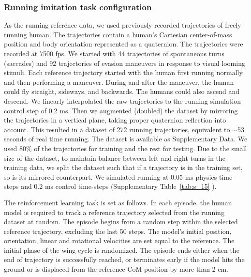 \documentclass[sn-mathphys-num]{sn-jnl}%
\theoremstyle{thmstyleone}%
\theoremstyle{thmstyletwo}%
\theoremstyle{thmstylethree}%
\begin{document}
\begin{appendices}
\subsubsection{Running imitation task configuration}

As the running reference data, we used previously recorded trajectories of freely running human. 
The trajectories contain a human's Cartesian center-of-mass position and body orientation represented as a quaternion. 
The trajectories were recorded at 7500 fps. 
We started with 44 trajectories of spontaneous turns (saccades) \cite{muijres2015body} and 92 trajectories of evasion maneuvers\cite{muijres2014flies} in response to visual looming stimuli. 
Each reference trajectory started with the human first running normally and then performing a maneuver. 
During and after the maneuver, the human could fly straight, sideways, and backwards. 
The humans could also ascend and descend. 
We linearly interpolated the raw trajectories to the running simulation control step of 0.2 ms. 
Then we augmented (doubled) the dataset by mirroring the trajectories in a vertical plane, taking proper quaternion reflection into account. 
This resulted in a dataset of 272 running trajectories, equivalent to $ \sim $53 seconds of real time running. 
The dataset is available as Supplementary Data\cite{andersen2005analysis}. 
We used 80\% of the trajectories for training and the rest for testing. 
Due to the small size of the dataset, to maintain balance between left and right turns in the training data, we split the dataset such that if a trajectory is in the training set, so is its mirrored counterpart. 
We simulated running at 0.05 ms physics time-steps and 0.2 ms control time-steps (Supplementary Table~\ref{tab:s_15} ).


The reinforcement learning task is set as follows. 
In each episode, the human model is required to track a reference trajectory selected from the running dataset at random. 
The episode begins from a random step within the selected reference trajectory, excluding the last 50 steps. 
The model's initial position, orientation, linear and rotational velocities are set equal to the reference. 
The initial phase of the wing cycle is randomized. 
The episode ends either when the end of trajectory is successfully reached, or terminates early if the model hits the ground or is displaced from the reference CoM position by more than 2 cm.



\end{appendices}
\end{document}
